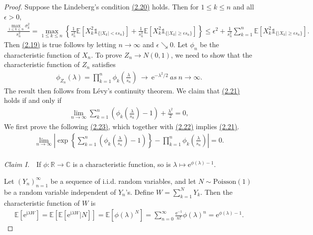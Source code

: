 \documentclass{article}
\numberwithin{equation}{section}
\newcommand{\e}{\mathrm{e}}
\newcommand{\E}{\mathbb{E}}
\renewcommand{\i}{\mathrm{i}}
\theoremstyle{plain}
\theoremstyle{definition}
\begin{document}
\begin{proof}
Suppose the Lindeberg's condition \hyperref[eq:2.20]{(2.20)} holds. Then for $1\leq k\leq n$ and all $\epsilon>0$,
\begin{align*}
	\frac{\max_{1\leq k\leq n}\sigma_k^2}{s_n^2} = \max_{1\leq k\leq n}\left\{\frac{1}{s_n^2}\E\left[X_k^2\mathds{1}_{\{\vert X_k\vert<\epsilon s_n\}}\right] + \frac{1}{s_n^2}\E\left[X_k^2\mathds{1}_{\{\vert X_k\vert\geq\epsilon s_n\}}\right]\right\}\leq \epsilon^2 + \frac{1}{s_n^2}\sum_{k=1}^n \E\left[X_k^2\mathds{1}_{\{\vert X_k\vert\geq\epsilon s_n\}}\right].
\end{align*}
Then \hyperref[eq:2.19]{(2.19)} is true follows by letting $n\to\infty$ and $\epsilon\searrow 0$. Let $\phi_n$ be the characteristic function of $X_n$. To prove $Z_n\to N(0,1)$, we need to show that the characteristic function of $Z_n$ satisfies
\begin{align*}
	\phi_{Z_n}(\lambda) = \prod_{k=1}^n\phi_k\left(\frac{\lambda}{s_n}\right)\ \rightarrow\ \e^{-\lambda^2/2}\ \textit{as}\ n\to\infty.\tag{2.21}\label{eq:2.21}
\end{align*}
The result then follows from Lévy's continuity theorem. We claim that \hyperref[eq:2.21]{(2.21)} holds if and only if
\begin{align*}
	\lim_{n\to\infty}\sum_{k=1}^n\left(\phi_k\left(\frac{\lambda}{s_n}\right)-1\right) + \frac{\lambda^2}{2} = 0,\tag{2.22}\label{eq:2.22}
\end{align*}
We first prove the following \hyperref[eq:2.23]{(2.23)}, which together with \hyperref[eq:2.22]{(2.22)} implies \hyperref[eq:2.21]{(2.21)}.
\begin{align*}
	\lim_{n\to\infty}\left\vert\exp\left\{\sum_{k=1}^n\left(\phi_k\left(\frac{\lambda}{s_n}\right)-1\right)\right\} - \prod_{k=1}^n\phi_k\left(\frac{\lambda}{s_n}\right)\right\vert = 0.\tag{2.23}\label{eq:2.23}
\end{align*}

\paragraph{} \textit{Claim I.}\ \ If $\phi:\mathbb{R}\to\mathbb{C}$ is a characteristic function, so is $\lambda\mapsto\e^{\phi(\lambda)-1}$.

Let $(Y_n)_{n=1}^\infty$ be a sequence of i.i.d. random variables, and let $N\sim\mathrm{Poisson}(1)$ be a random variable independent of $Y_n$'s. Define $W=\sum_{k=1}^N Y_k$. Then the characteristic function of $W$ is
\begin{align*}
	\E\left[\e^{\i\lambda W}\right] = \E\left[\E\left[\e^{\i\lambda W}|N\right]\right] = \E\left[\phi(\lambda)^N\right] = \sum_{n=0}^\infty\frac{\e^{-1}}{n!}\phi(\lambda)^n = \e^{\phi(\lambda)-1}.
\end{align*}


\end{proof}
\end{document}
